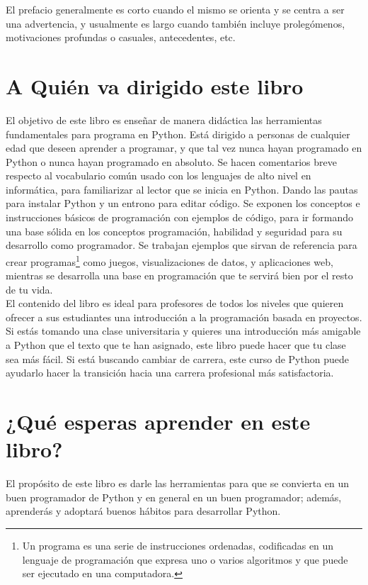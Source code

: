 El prefacio generalmente es corto cuando el mismo se orienta y se centra a ser una advertencia, y usualmente es largo cuando también incluye prolegómenos, motivaciones profundas o casuales, antecedentes, etc.


\section*{A Quién va dirigido este libro}

El objetivo de este libro es enseñar de manera didáctica las herramientas fundamentales para programa en Python.   Está dirigido a personas de cualquier edad que deseen aprender a programar, y que tal vez nunca hayan programado en Python o nunca hayan programado en absoluto. Se hacen  comentarios  breve respecto al vocabulario común usado con los lenguajes de alto nivel en informática, para familiarizar al lector que se inicia en Python.  Dando las pautas para instalar Python y un entrono para editar  código. Se exponen los conceptos e instrucciones básicos de programación con ejemplos de código, para ir formando una base sólida en los conceptos  programación, habilidad y seguridad para su desarrollo como programador. Se trabajan ejemplos que sirvan de referencia para crear programas\footnote{Un programa es una serie de instrucciones ordenadas, codificadas en un lenguaje de programación que expresa uno o varios algoritmos y que puede ser ejecutado en una computadora.} como juegos, visualizaciones de datos, y aplicaciones web, mientras se desarrolla una base en programación que te servirá bien por el resto de tu vida.\\


El contenido del libro es ideal para profesores de todos los niveles que quieren ofrecer a sus estudiantes una introducción
a la programación basada en proyectos. Si estás tomando una clase universitaria y quieres una introducción  más amigable 
a Python que el texto que te han asignado, este libro puede hacer que tu clase sea más fácil. Si está buscando cambiar de carrera, 
este curso de Python puede ayudarlo hacer la transición hacia una carrera profesional más satisfactoria.



\section*{¿Qué esperas aprender en este libro?}
El propósito de este libro es darle las herramientas para que se convierta en un buen programador de Python  y  en general en un buen  programador;  además,  aprenderás y adoptará buenos hábitos para desarrollar Python.


